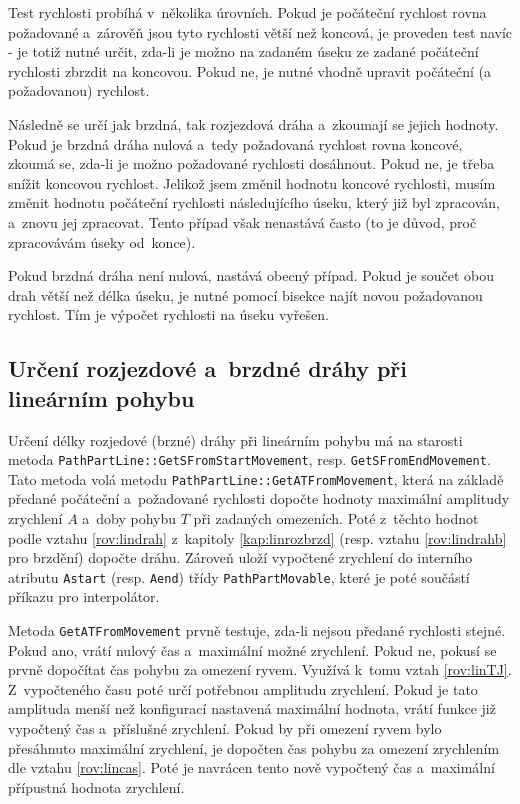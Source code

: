 	Test rychlosti probíhá v~několika úrovních. Pokud je počáteční rychlost rovna požadované a~zárověň jsou tyto rychlosti větší než koncová, je proveden test navíc - je totiž nutné určit, zda-li je možno na zadaném úseku ze zadané počáteční rychlosti zbrzdit na koncovou. Pokud ne, je nutné vhodně upravit počáteční (a požadovanou) rychlost.
	
	Následně se určí jak brzdná, tak rozjezdová dráha a~zkoumají se jejich hodnoty. Pokud je brzdná dráha nulová a~tedy požadovaná rychlost rovna koncové, zkoumá se, zda-li je možno požadované rychlosti dosáhnout. Pokud ne, je třeba snížit koncovou rychlost. Jelikož jsem změnil hodnotu koncové rychlosti, musím změnit hodnotu počáteční rychlosti následujícího úseku, který již byl zpracován, a~znovu jej zpracovat. Tento případ však nenastává často (to je důvod, proč zpracovávám úseky od~konce).
	
	Pokud brzdná dráha není nulová, nastává obecný případ. Pokud je součet obou drah větší než délka úseku, je nutné pomocí bisekce najít novou požadovanou rychlost. Tím je výpočet rychlosti na úseku vyřešen.
	
	\subsection{Určení rozjezdové a~brzdné dráhy při lineárním pohybu}\label{kap:drahlin}
	
	Určení délky rozjedové (brzné) dráhy při lineárním pohybu má na starosti metoda {\tt PathPartLine::GetSFromStartMovement}, resp. {\tt GetSFromEndMovement}. Tato metoda volá metodu {\tt PathPartLine::GetATFromMovement}, která na základě předané počáteční a~požadované rychlosti dopočte hodnoty maximální amplitudy zrychlení $A$ a~doby pohybu $T$ při zadaných omezeních. Poté z~těchto hodnot podle vztahu \ref{rov:lindrah} z~kapitoly \ref{kap:linrozbrzd} (resp. vztahu \ref{rov:lindrahb} pro brzdění) dopočte dráhu. Zároveň uloží vypočtené zrychlení do interního atributu {\tt Astart} (resp. {\tt Aend}) třídy {\tt PathPartMovable}, které je poté součástí příkazu pro interpolátor.
	
	Metoda {\tt GetATFromMovement} prvně testuje, zda-li nejsou předané rychlosti stejné. Pokud ano, vrátí nulový čas a~maximální možné zrychlení. Pokud ne, pokusí se prvně dopočítat čas pohybu za omezení ryvem. Využívá k~tomu vztah \ref{rov:linTJ}. Z~vypočteného času poté určí potřebnou amplitudu zrychlení. Pokud je tato amplituda menší než konfigurací nastavená maximální hodnota, vrátí funkce již vypočtený čas a~příslušné zrychlení. Pokud by při omezení ryvem bylo přesáhnuto maximální zrychlení, je dopočten čas pohybu za omezení zrychlením dle vztahu \ref{rov:lincas}. Poté je navrácen tento nově vypočtený čas a~maximální přípustná hodnota zrychlení.
	
